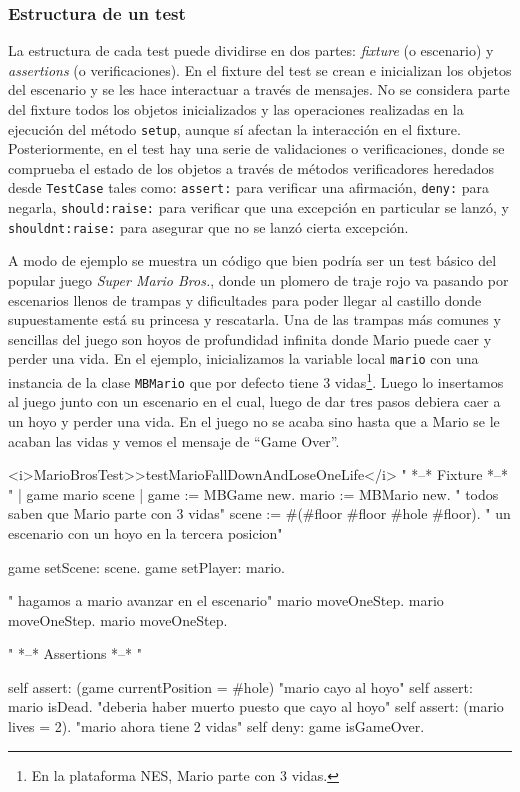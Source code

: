 \subsubsection{Estructura de un test}
\par La estructura de cada test puede dividirse en dos partes: \emph{fixture} (o escenario) y \emph{assertions} (o verificaciones). En el fixture del test se crean e inicializan los objetos del escenario y se les hace interactuar a través de mensajes. No se considera parte del fixture todos los objetos inicializados y las operaciones realizadas en la ejecución del método {\tt setup}, aunque sí afectan la interacción en el fixture. Posteriormente, en el test hay una serie de validaciones o verificaciones, donde se comprueba el estado de los objetos a través de métodos verificadores heredados desde {\tt TestCase} tales como: {\tt assert:} para verificar una afirmación, {\tt deny:} para negarla, {\tt should:raise:} para verificar que una excepción en particular se lanzó, y {\tt shouldnt:raise:} para asegurar que no se lanzó cierta excepción.

\par A modo de ejemplo se muestra un código que bien podría ser un test básico del popular juego \emph{Super Mario Bros.}, donde un plomero de traje rojo va pasando por escenarios llenos de trampas y dificultades para poder llegar al castillo donde supuestamente está su princesa y rescatarla. Una de las trampas más comunes y sencillas del juego son hoyos de profundidad infinita donde Mario puede caer y perder una vida. En el ejemplo, inicializamos la variable local {\tt mario} con una instancia de la clase {\tt MBMario} que por defecto tiene 3 vidas\footnote{En la plataforma NES, Mario parte con 3 vidas.}. Luego lo insertamos al juego junto con un escenario en el cual, luego de dar tres pasos debiera caer a un hoyo y perder una vida. En el juego no se acaba sino hasta que a Mario se le acaban las vidas y vemos el mensaje de ``Game Over''. 

\begin{codeWithLineNumbers}
<i>MarioBrosTest>>testMarioFallDownAndLoseOneLife</i>
	" *--* Fixture *--* "
	| game mario scene |
	game := MBGame new.
	mario := MBMario new. " todos saben que Mario parte con 3 vidas"
	scene := #(#floor #floor #hole #floor). " un escenario con un hoyo en la tercera posicion"

	game setScene: scene.
	game setPlayer: mario.

	" hagamos a mario avanzar en el escenario"
	mario moveOneStep. 
	mario moveOneStep.
	mario moveOneStep. 
		
	" *--* Assertions *--* "
	
	self assert: (game currentPosition = #hole) "mario cayo al hoyo" 
	self assert: mario isDead. "deberia haber muerto puesto que cayo al hoyo"
	self assert: (mario lives = 2). "mario ahora tiene 2 vidas"
	self deny: game isGameOver. 
	

\end{codeWithLineNumbers}

